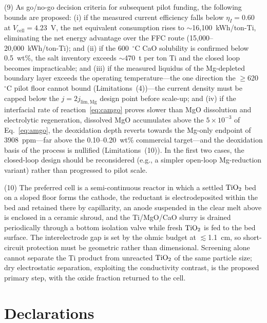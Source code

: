 \documentclass[pdflatex,sn-basic,Numbered]{sn-jnl}
\begin{document}
(9) As go/no-go decision criteria for subsequent pilot funding, the following bounds are proposed: (i) if the measured current efficiency falls below $\eta_I = 0.60$ at $V_{\mathrm{cell}} = 4.23$~V, the net equivalent consumption rises to $\sim$16{,}100~kWh/ton-Ti, eliminating the net energy advantage over the FFC route (15{,}000--20{,}000~kWh/ton-Ti); and (ii) if the 600~$^{\circ}$C CaO solubility is confirmed below 0.5~wt\%, the salt inventory exceeds $\sim$470~t per ton Ti and the closed loop becomes impracticable; and (iii) if the measured liquidus of the Mg-depleted boundary layer exceeds the operating temperature---the one direction the $\geq$620~$^{\circ}$C pilot floor cannot bound (Limitations~(4))---the current density must be capped below the $j = 2j_{\mathrm{lim,Mg}}$ design point before scale-up; and (iv) if the interfacial rate of reaction~\ref{eq:camgo} proves slower than MgO dissolution and electrolytic regeneration, dissolved MgO accumulates above the $5\times10^{-3}$ of Eq.~\ref{eq:amgo}, the deoxidation depth reverts towards the Mg-only endpoint of 3908~ppm---far above the 0.10--0.20~wt\% commercial target---and the deoxidation basis of the process is nullified (Limitations~(10)). In the first two cases, the closed-loop design should be reconsidered (e.g., a simpler open-loop Mg-reduction variant) rather than progressed to pilot scale.

(10) The preferred cell is a semi-continuous reactor in which a settled $\ce{TiO2}$ bed on a sloped floor forms the cathode, the reductant is electrodeposited within the bed and retained there by capillarity, an anode suspended in the clear melt above is enclosed in a ceramic shroud, and the Ti/MgO/CaO slurry is drained periodically through a bottom isolation valve while fresh $\ce{TiO2}$ is fed to the bed surface. The interelectrode gap is set by the ohmic budget at $\lesssim$1.1~cm, so short-circuit protection must be geometric rather than dimensional. Screening alone cannot separate the Ti product from unreacted $\ce{TiO2}$ of the same particle size; dry electrostatic separation, exploiting the conductivity contrast, is the proposed primary step, with the oxide fraction returned to the cell.

\backmatter

\section*{Declarations}
\end{document}
